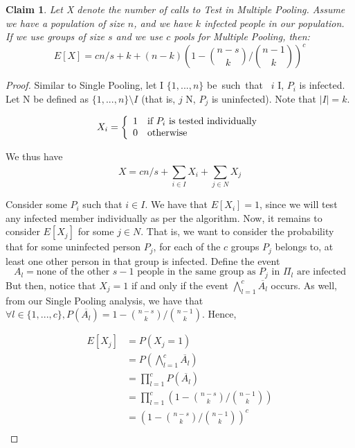 \documentclass[12pt]{article}
\newtheorem{claim}[theorem]{Claim}
\begin{document}
\begin{claim}
Let X denote the number of calls to {\sf Test} in Multiple Pooling. Assume we have a population of size $n$, and we have $k$ infected people in our population. If we use groups of size $s$ and we use $c$ pools for Multiple Pooling, then: $$E[X]= cn/s+k+(n-k){(1-{n-s \choose k}/{n-1 \choose k})^c} $$

\end{claim}

\begin{proof}

Similar to Single Pooling, let I \subseteq $\{1,...,n\}$ \mbox{be such that } \forall $i$ \in I, $P_i$ is infected. Let N be defined as $\{1,...,n\} \setminus I$ (that is, \forall $j$ \in N, $P_j$ is uninfected). Note that $|I|=k$.


\begin{equation}
X_i = \left\lbrace
\begin{array}{r l}
1 & \mbox{if }P_i \mbox{ is tested individually} \\
0 & \mbox{otherwise}
\end{array}
\right.
\label{eqn:abs}
\end{equation}

We thus have $$X=cn/s + \sum\limits_{i \in I}^{}X_i + \sum\limits_{j \in N}^{}X_j$$

Consider some $P_i$ such that $i \in I$. We have that $E[X_i]=1$, since we will test any infected member individually as per the algorithm. Now, it remains to consider $E[X_j]$ for some $j \in N$. That is, we want to consider the probability that for some uninfected person $P_j$, for each of the $c$ groups $P_j$ belongs to, at least one other person in that group is infected. Define the event  $$A_l = \mbox{none of the other } s-1 \mbox{ people in the same group as } P_j \mbox{ in } \Pi_l \mbox{ are infected}$$
But then, notice that $X_j=1$ if and only if the event $\bigwedge\limits_{l=1}^{c}{\overline{A_l}}$ occurs.
As well, from our Single Pooling analysis, we have that $\forall l \in \{1,...,c\}, P(\overline{A_l})=1-{n-s \choose k}/{n-1 \choose k}$.
Hence,


\begin{align*}
E[X_j] &= P(X_j=1) \\ 
&= P(\bigwedge\limits_{l=1}^{c}{\overline{A_l}}) \\
&=\prod\limits_{l=1}^{c}P({\overline{A_l}}) \\
&=\prod\limits_{l=1}^{c}{(1-{n-s \choose k}/{n-1 \choose k})} \\
&={(1-{n-s \choose k}/{n-1 \choose k})}^c \\
\end{align*}



\end{proof}
\end{document}

